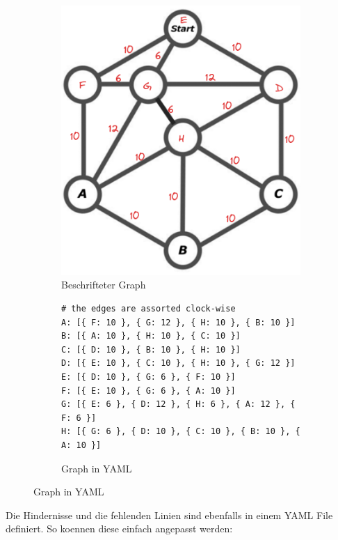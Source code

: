 \begin{figure}[H]
\begin{subfigure}{0.275\textwidth}
\includegraphics[width=0.95\linewidth]{img/graph_with_weighted_edges.png} 
\caption{Beschrifteter Graph}
\label{fig:labeled-graph}
\end{subfigure}
\begin{subfigure}{0.720\textwidth}
\begin{footnotesize}
\begin{verbatim}
# the edges are assorted clock-wise
A: [{ F: 10 }, { G: 12 }, { H: 10 }, { B: 10 }]
B: [{ A: 10 }, { H: 10 }, { C: 10 }]
C: [{ D: 10 }, { B: 10 }, { H: 10 }]
D: [{ E: 10 }, { C: 10 }, { H: 10 }, { G: 12 }]
E: [{ D: 10 }, { G: 6 }, { F: 10 }]
F: [{ E: 10 }, { G: 6 }, { A: 10 }]
G: [{ E: 6 }, { D: 12 }, { H: 6 }, { A: 12 }, { F: 6 }]
H: [{ G: 6 }, { D: 10 }, { C: 10 }, { B: 10 }, { A: 10 }]
\end{verbatim}
\end{footnotesize}
\caption{Graph in YAML}
\label{fig:graph-yaml}
\end{subfigure}
\end{figure}

Die Hindernisse und die fehlenden Linien sind ebenfalls in einem YAML File definiert. So koennen diese einfach angepasst werden:

